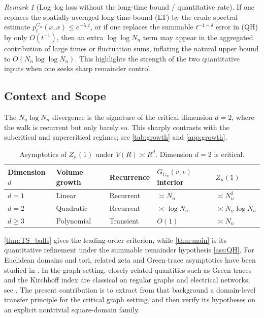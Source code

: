\documentclass[reqno]{amsart}
\numberwithin{equation}{section}
\theoremstyle{definition}
\theoremstyle{remark}
\newtheorem{remark}[remark]{Remark}
\newcommand{\Cref}[1]{\autoref{#1}}
\begin{document}
\begin{remark}[Log--log loss without the long-time bound / quantitative rate]\label{rem:loglog}
If one replaces the spatially averaged long-time bound (LT) by the crude spectral estimate $p_t^{G_n}(x,x)\le e^{-\lambda_1 t}$, or if one replaces the summable $t^{-1-\delta}$ error in (QH) by only $O(t^{-1})$, then an extra $\log\log N_n$ term may appear in the aggregated contribution of large times or fluctuation sums, inflating the natural upper bound to $O(N_n \log\log N_n)$. This highlights the strength of the two quantitative inputs when one seeks sharp remainder control.
\end{remark}

\subsection{Context and Scope}
The $N_n \log N_n$ divergence is the signature of the critical dimension $d=2$, where the walk is recurrent but only barely so. This sharply contrasts with the subcritical and supercritical regimes; see \Cref{tab:growth} and \Cref{app:growth}.

\begin{table}[htbp]
\centering
\small
\caption{Asymptotics of $Z_n(1)$ under $V(R) \asymp R^d$. Dimension $d=2$ is critical.}
\label{tab:growth}
\begin{tabular}{@{}lllll@{}}\toprule
	\textbf{Dimension $d$} & \textbf{Volume growth} & \textbf{Recurrence} & \textbf{$G_{G_n}(v,v)$ interior} & \textbf{$Z_n(1)$} \\
\midrule
$d=1$ & Linear & Recurrent & $\asymp N_n$ & $\asymp N_n^{2}$ \\
$d=2$ & Quadratic & Recurrent & $\asymp \log N_n$ & $\asymp N_n \log N_n$ \\
$d \ge 3$ & Polynomial & Transient & $O(1)$ & $\asymp N_n$ \\
\bottomrule
\end{tabular}
\end{table}

\Cref{thm:TS_balls} gives the leading-order criterion, while \Cref{thm:main} is its quantitative refinement under the summable remainder hypothesis \Cref{ass:QH}. For Euclidean domains and tori, related zeta and Green-trace asymptotics have been studied in \cite{Colin85,FrankSabin11}. In the graph setting, closely related quantities such as Green traces and the Kirchhoff index are classical on regular graphs and electrical networks; see \cite{MizunoTachikawa03,KleinRandic93,LyonsPeres16}. The present contribution is to extract from that background a domain-level transfer principle for the critical graph setting, and then verify its hypotheses on an explicit nontrivial square-domain family.
\end{document}
